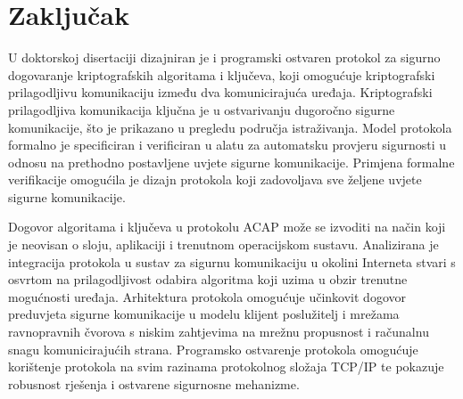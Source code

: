 \chapter{Zaključak}

U doktorskoj disertaciji dizajniran je i programski ostvaren protokol za
sigurno dogovaranje kriptografskih algoritama i ključeva, koji omogućuje
kriptografski prilagodljivu komunikaciju između dva komunicirajuća uređaja.
Kriptografski prilagodljiva komunikacija ključna je u ostvarivanju dugoročno
sigurne komunikacije, što je prikazano u pregledu područja istraživanja.
Model protokola formalno je
specificiran i verificiran u alatu za automatsku provjeru sigurnosti
u odnosu na prethodno postavljene uvjete sigurne komunikacije. Primjena
formalne verifikacije omogućila je dizajn protokola koji zadovoljava sve željene
uvjete sigurne komunikacije.

Dogovor algoritama i ključeva u protokolu ACAP može se izvoditi na način koji je
neovisan o sloju, aplikaciji i trenutnom operacijskom sustavu. 
Analizirana
je integracija protokola u sustav za sigurnu komunikaciju u okolini Interneta
stvari s osvrtom na prilagodljivost odabira algoritma koji uzima u obzir
trenutne
mogućnosti uređaja. Arhitektura protokola omogućuje učinkovit dogovor preduvjeta
sigurne komunikacije u modelu klijent poslužitelj i mrežama ravnopravnih čvorova
s niskim zahtjevima na mrežnu propusnost i računalnu snagu komunicirajućih
strana. Programsko ostvarenje protokola omogućuje korištenje protokola na svim
razinama protokolnog složaja TCP/IP te pokazuje robusnost rješenja i
ostvarene sigurnosne mehanizme.

